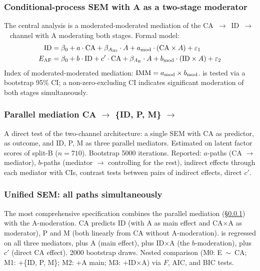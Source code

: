 \subsubsection{Conditional-process SEM with A as a two-stage moderator}
\label{subsubsec:cp_sem}

The central analysis is a moderated-moderated mediation of the CA~$\to$~ID~$\to$~\EAF{} channel with A moderating both stages. Formal model:
\begin{align}
\text{ID} &= \beta_0 + a \cdot \text{CA} + \beta_{A_{\text{ID}}} \cdot A + a_{\text{mod}} \cdot (\text{CA} \times A) + \varepsilon_1 \\
\text{$E_{\mathrm{AF}}${}} &= \beta_0 + b \cdot \text{ID} + c' \cdot \text{CA} + \beta_{A_{\text{E}}} \cdot A + b_{\text{mod}} \cdot (\text{ID} \times A) + \varepsilon_2
\end{align}
Index of moderated-moderated mediation: $\mathrm{IMM} = a_{\text{mod}} \times b_{\text{mod}}$. \IMM{} is tested via a bootstrap 95\% CI; a non-zero-excluding CI indicates significant moderation of both stages simultaneously.

\subsubsection{Parallel mediation CA $\to$ \{ID, P, M\} $\to$ \EAF{}}

A direct test of the two-channel architecture: a single SEM with CA as predictor, \EAF{} as outcome, and ID, P, M as three parallel mediators. Estimated on latent factor scores of split-B ($n = 710$). Bootstrap 5000 iterations. Reported: $a$-paths (CA $\to$ mediator), $b$-paths (mediator $\to$ \EAF{} controlling for the rest), indirect effects through each mediator with CIs, contrast tests between pairs of indirect effects, direct $c'$.

\subsubsection{Unified SEM: all paths simultaneously}

The most comprehensive specification combines the parallel mediation (§\ref{subsubsec:cp_sem}) with the A-moderation. CA predicts ID (with A as main effect and CA$\times$A as moderator), P and M (both linearly from CA without A-moderation). \EAF{} is regressed on all three mediators, plus A (main effect), plus ID$\times$A (the $b$-moderation), plus $c'$ (direct CA effect). 2000 bootstrap draws. Nested comparison (M0: E~$\sim$~CA; M1: +\{ID, P, M\}; M2: +A main; M3: +ID$\times$A) via $F$, AIC, and BIC tests.

